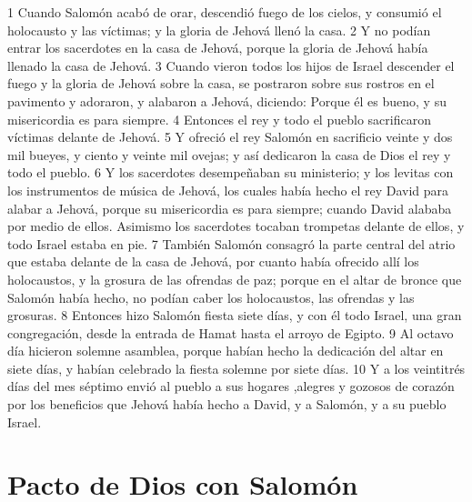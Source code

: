 1 Cuando Salomón acabó de orar, descendió fuego de los cielos, y consumió el holocausto y las víctimas; y la gloria de Jehová llenó la casa.
2 Y no podían entrar los sacerdotes en la casa de Jehová, porque la gloria de Jehová había llenado la casa de Jehová.
3 Cuando vieron todos los hijos de Israel descender el fuego y la gloria de Jehová sobre la casa, se postraron sobre sus rostros en el pavimento y adoraron, y alabaron a Jehová,  diciendo: Porque él es bueno, y su misericordia es para siempre. 
4 Entonces el rey y todo el pueblo sacrificaron víctimas delante de Jehová.
5 Y ofreció el rey Salomón en sacrificio veinte y dos mil bueyes, y ciento y veinte mil ovejas; y así dedicaron la casa de Dios el rey y todo el pueblo.
6 Y los sacerdotes desempeñaban su ministerio; y los levitas con los instrumentos de música de Jehová, los cuales había hecho el rey David para alabar a Jehová, porque su misericordia es para siempre; cuando David alababa por medio de ellos. Asimismo los sacerdotes tocaban trompetas delante de ellos, y todo Israel estaba en pie.
7 También Salomón consagró la parte central del atrio que estaba delante de la casa de Jehová, por cuanto había ofrecido allí los holocaustos, y la grosura de las ofrendas de paz; porque en el altar de bronce que Salomón había hecho, no podían caber los holocaustos, las ofrendas  y las grosuras.
8 Entonces hizo Salomón fiesta siete días, y con él todo Israel, una gran congregación, desde la entrada de Hamat hasta el arroyo de Egipto.
9 Al octavo día hicieron solemne asamblea, porque habían hecho la dedicación del altar en siete días, y habían celebrado la fiesta solemne por siete días.
10 Y  a  los veintitrés días del mes séptimo envió al pueblo  a  sus hogares ,alegres y gozosos de corazón por los beneficios que Jehová había hecho  a  David, y  a  Salomón, y  a  su pueblo Israel.
\section*{Pacto de Dios con Salomón}

